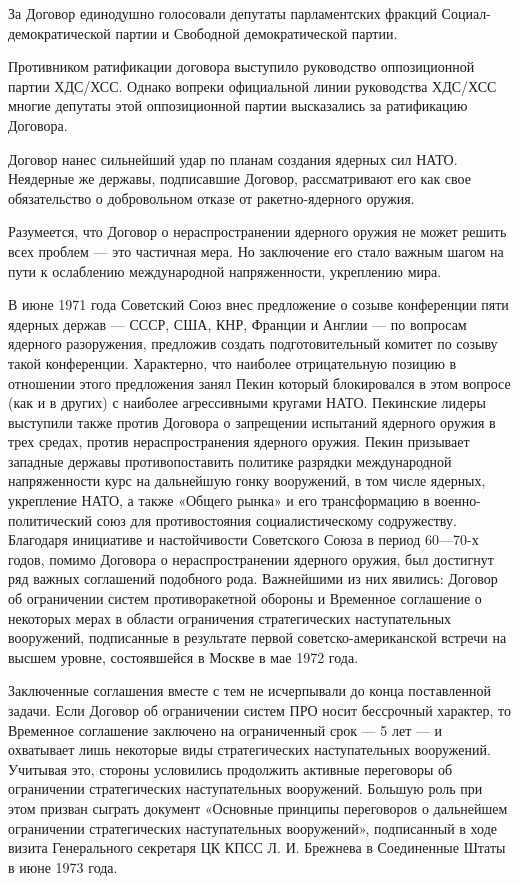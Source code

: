 \documentclass[12pt, a4paper, openany]{book}
\begin{document}
	За Договор единодушно голосовали депутаты парламентских фракций Социал-демократической партии и Свободной демократической партии.
	
	Противником ратификации договора выступило руководство оппозиционной партии ХДС/ХСС. Однако вопреки официальной линии руководства ХДС/ХСС многие депутаты этой оппозиционной партии высказались за ратификацию Договора.
	
	Договор нанес сильнейший удар по планам создания ядерных сил НАТО. Неядерные же державы, подписавшие Договор, рассматривают его как свое обязательство о добровольном отказе от ракетно-ядерного оружия.
	
	Разумеется, что Договор о нераспространении ядерного оружия не может решить всех проблем — это частичная мера. Но заключение его стало важным шагом на пути к ослаблению международной напряженности, укреплению мира.
	
	В июне 1971 года Советский Союз внес предложение о созыве конференции пяти ядерных держав — СССР, США, КНР, Франции и Англии — по вопросам ядерного разоружения, предложив создать подготовительный комитет по созыву такой конференции. Характерно, что наиболее отрицательную позицию в отношении этого предложения занял Пекин который блокировался в этом вопросе (как и в других) с наиболее агрессивными кругами НАТО. Пекинские лидеры выступили также против Договора о запрещении испытаний ядерного оружия в трех средах, против нераспространения ядерного оружия. Пекин призывает западные державы противопоставить политике разрядки международной напряженности курс на дальнейшую гонку вооружений, в том числе ядерных, укрепление НАТО, а также «Общего рынка» и его трансформацию в военно-политический союз для противостояния социалистическому содружеству. Благодаря инициативе и настойчивости Советского Союза в период 60—70-х годов, помимо Договора о нераспространении ядерного оружия, был достигнут ряд важных соглашений подобного рода. Важнейшими из них явились: Договор об ограничении систем противоракетной обороны и Временное соглашение о некоторых мерах в области ограничения стратегических наступательных вооружений, подписанные в результате первой советско-американской встречи на высшем уровне, состоявшейся в Москве в мае 1972 года.
	
	Заключенные соглашения вместе с тем не исчерпывали до конца поставленной задачи. Если Договор об ограничении систем ПРО носит бессрочный характер, то Временное соглашение заключено на ограниченный срок — 5 лет — и охватывает лишь некоторые виды стратегических наступательных вооружений. Учитывая это, стороны условились продолжить активные переговоры об ограничении стратегических наступательных вооружений. Большую роль при этом призван сыграть документ «Основные принципы переговоров о дальнейшем ограничении стратегических наступательных вооружений», подписанный в ходе визита Генерального секретаря ЦК КПСС Л. И. Брежнева в Соединенные Штаты в июне 1973 года.
	
\end{document}
